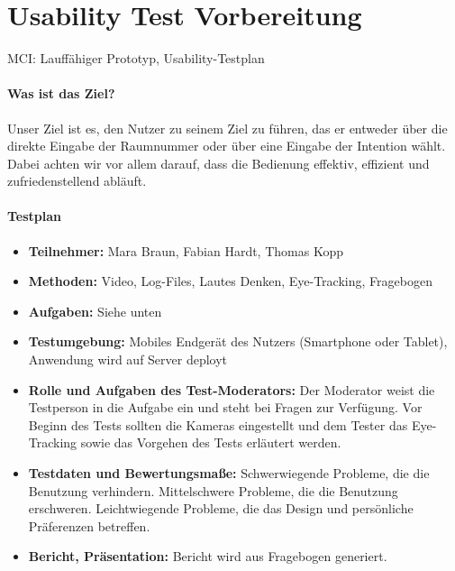 \chapter{Usability Test Vorbereitung}
MCI: Lauffähiger Prototyp, Usability-Testplan

\subsubsection*{Was ist das Ziel?}
Unser Ziel ist es, den Nutzer zu seinem Ziel zu führen, das er entweder über die direkte Eingabe der Raumnummer oder über eine Eingabe der Intention wählt.
Dabei achten wir vor allem darauf, dass die Bedienung effektiv, effizient und zufriedenstellend abläuft.
\subsubsection*{Testplan}
\begin{itemize}
\item \textbf{Teilnehmer:} Mara Braun, Fabian Hardt, Thomas Kopp
\item \textbf{Methoden:} Video, Log-Files, Lautes Denken, Eye-Tracking, Fragebogen
\item \textbf{Aufgaben:} Siehe unten
\item \textbf{Testumgebung:} Mobiles Endgerät des Nutzers (Smartphone oder Tablet), Anwendung wird auf Server deployt
\item \textbf{Rolle und Aufgaben des Test-Moderators:} Der Moderator weist die Testperson in die Aufgabe ein und steht bei Fragen zur Verfügung. Vor Beginn des Tests sollten die Kameras eingestellt und dem Tester das Eye-Tracking sowie das Vorgehen des Tests erläutert werden.
\item \textbf{Testdaten und Bewertungsmaße:} Schwerwiegende Probleme, die die Benutzung verhindern. Mittelschwere Probleme, die die Benutzung erschweren. Leichtwiegende Probleme, die das Design und persönliche Präferenzen betreffen.
\item \textbf{Bericht, Präsentation:} Bericht wird aus Fragebogen generiert.

\end{itemize}
